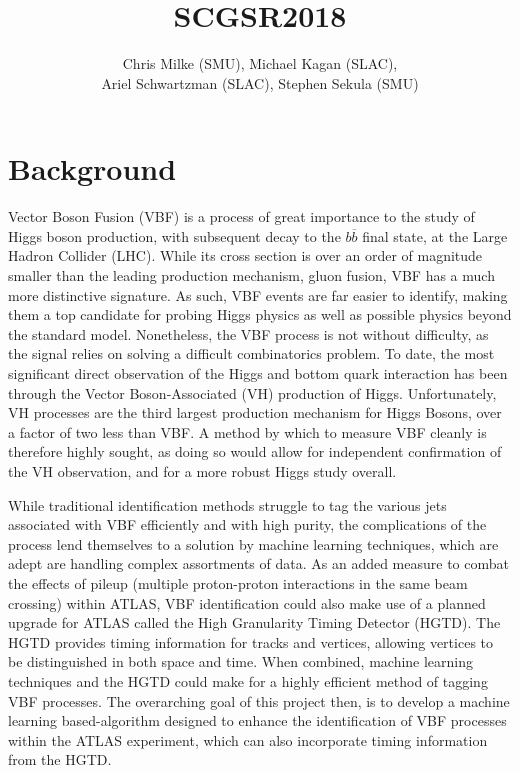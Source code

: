 \documentclass[12pt,letterpaper]{article}
\begin{document}
\pagestyle{fancy}


\pagestyle{plain}
\label{sec:coverpaqe}




\title{{\large SCGSR2018}}

\author{Chris Milke (SMU), Michael Kagan (SLAC),\\
  Ariel Schwartzman (SLAC), Stephen Sekula (SMU)}



\section*{Background}
    Vector Boson Fusion (VBF) is a process of great importance to the study of Higgs boson production, with subsequent decay to the $b\overline{b}$ final state\cite{Aaboud:2018gay}, at the Large Hadron Collider (LHC). While its cross section is over an order of magnitude smaller than the leading production mechanism, gluon fusion\cite{deFlorian:2016spz}, VBF has a much more distinctive signature. As such, VBF events are far easier to identify, making them a top candidate for probing Higgs physics as well as possible physics beyond the standard model. Nonetheless, the VBF process is not without difficulty, as the signal relies on solving a difficult combinatorics problem. To date, the most significant direct observation of the Higgs and bottom quark interaction has been through the Vector Boson-Associated (VH) production of Higgs\cite{Aaboud:2018zhk}\cite{Sirunyan:2018kst}. Unfortunately, VH processes are the third largest production mechanism for Higgs Bosons, over a factor of two less than VBF. A method by which to measure VBF cleanly is therefore highly sought, as doing so would allow for independent confirmation of the VH observation, and for a more robust Higgs study overall.  
    
    While traditional identification methods struggle to tag the various jets associated with VBF efficiently and with high purity, the complications of the process lend themselves to a solution by machine learning techniques, which are adept are handling complex assortments of data. As an added measure to combat the effects of pileup (multiple proton-proton interactions in the same beam crossing) within ATLAS, VBF identification could also make use of a planned upgrade for ATLAS called the High Granularity Timing Detector (HGTD)\cite{Collaboration:2623663}. The HGTD provides timing information for tracks and vertices, allowing vertices to be distinguished in both space and time. When combined, machine learning techniques and the HGTD could make for a highly efficient method of tagging VBF processes. The overarching goal of this project then, is to develop a machine learning based-algorithm designed to enhance the identification of VBF processes within the ATLAS experiment, which can also incorporate timing information from the HGTD.  
\end{document}
